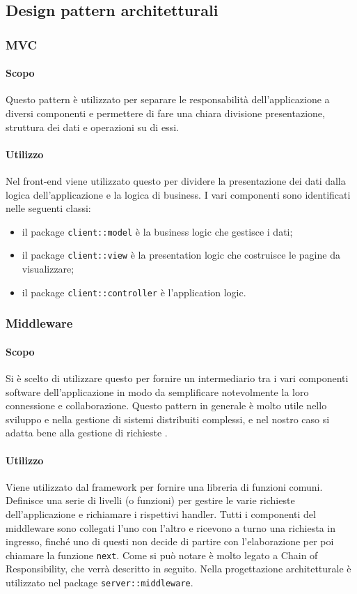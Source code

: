 \documentclass[12pt,a4paper]{article}
\begin{document}
\subsection{Design pattern architetturali}
\subsubsection{MVC}
\paragraph{Scopo}
Questo pattern è utilizzato per separare le responsabilità dell’applicazione a diversi componenti e permettere di fare una chiara divisione presentazione, struttura dei dati e operazioni su di essi.

\paragraph{Utilizzo}
Nel front-end viene utilizzato questo  per dividere la presentazione dei dati dalla logica dell'applicazione e la logica di business. I vari componenti sono identificati nelle seguenti classi:

\begin{itemize}
	\item il package \texttt{client::model} è la business logic che gestisce i dati;
	\item il package \texttt{client::view} è la presentation logic che costruisce le pagine da visualizzare;
	\item il package \texttt{client::controller} è l'application logic.
\end{itemize}

\subsubsection{Middleware}
\paragraph{Scopo}
Si è scelto di utilizzare questo  per fornire un intermediario tra i vari componenti software dell’applicazione in modo da semplificare notevolmente la loro connessione e collaborazione. Questo pattern in generale è molto utile nello sviluppo e nella gestione di sistemi distribuiti complessi, e nel nostro caso si adatta bene alla gestione di richieste .
\paragraph{Utilizzo}
Viene utilizzato dal framework  per fornire una libreria di funzioni comuni. Definisce una serie di livelli (o funzioni) per gestire le varie richieste dell’applicazione e richiamare i rispettivi handler. Tutti i componenti del middleware sono collegati l’uno con l’altro e ricevono a turno una richiesta in ingresso, finché uno di questi non decide di partire con l’elaborazione per poi chiamare la funzione \texttt{next}. Come si può notare è molto legato a Chain of Responsibility, che verrà descritto in seguito. Nella progettazione architetturale è utilizzato nel package \texttt{server::middleware}.
\end{document}
